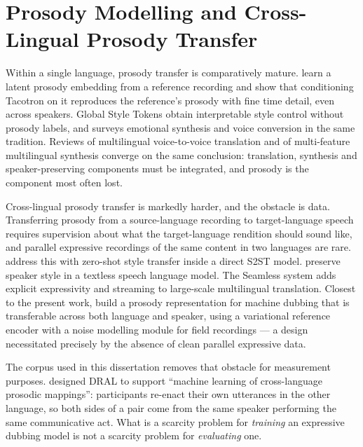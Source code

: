\section{Prosody Modelling and Cross-Lingual Prosody Transfer}
\label{sec:lit_prosody}

Within a single language, prosody transfer is comparatively mature.
 learn a latent prosody embedding from a reference recording and show
that conditioning Tacotron on it reproduces the reference's prosody with fine time detail, even
across speakers. Global Style Tokens \cite{wang2018gst} obtain interpretable style control without
prosody labels, and  surveys emotional synthesis and voice conversion in
the same tradition. Reviews of multilingual voice-to-voice translation
\cite{ambadekar2025review} and of multi-feature multilingual synthesis
\cite{nuthakki2023multilingual} converge on the same conclusion: translation, synthesis and
speaker-preserving components must be integrated, and prosody is the component most often lost.

Cross-lingual prosody transfer is markedly harder, and the obstacle is data. Transferring prosody
from a source-language recording to target-language speech requires supervision about what the
target-language rendition should sound like, and parallel expressive recordings of the same content
in two languages are rare.  address this with zero-shot style transfer
inside a direct S2ST model.  preserve speaker style in a textless speech
language model. The Seamless system \cite{seamless2023} adds explicit expressivity and streaming to
large-scale multilingual translation. Closest to the present work,
 build a prosody representation for machine dubbing that is
transferable across both language and speaker, using a variational reference encoder with a noise
modelling module for field recordings --- a design necessitated precisely by the absence of clean
parallel expressive data.

The corpus used in this dissertation removes that obstacle for measurement purposes.
 designed DRAL to support ``machine learning of cross-language prosodic
mappings'': participants re-enact their own utterances in the other language, so both sides of a
pair come from the same speaker performing the same communicative act. What is a scarcity problem
for \emph{training} an expressive dubbing model is not a scarcity problem for \emph{evaluating} one.

